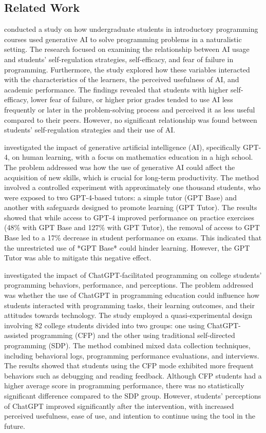 \documentclass[a4paper,twoside]{article}
\begin{document}
\subsection{Related Work}

\cite{Margulieux24} conducted a study on how undergraduate students in
introductory programming courses used generative AI to solve programming
problems in a naturalistic setting. The research focused on examining the
relationship between AI usage and students’ self-regulation strategies,
self-efficacy, and fear of failure in programming. Furthermore, the study
explored how these variables interacted with the characteristics of the learners,
the perceived usefulness of AI, and academic performance. The findings revealed
that students with higher self-efficacy, lower fear of failure, or higher prior
grades tended to use AI less frequently or later in the problem-solving process
and perceived it as less useful compared to their peers. However, no significant
relationship was found between students’ self-regulation strategies and their
use of AI.

\cite{Bastani24} investigated the impact of generative artificial intelligence
(AI), specifically GPT-4, on human learning, with a focus on mathematics
education in a high school. The problem addressed was how the use of generative
AI could affect the acquisition of new skills, which is crucial for long-term
productivity. The method involved a controlled experiment with approximately
one thousand students, who were exposed to two GPT-4-based tutors: a simple
tutor (GPT Base) and another with safeguards designed to promote learning
(GPT Tutor). The results showed that while access to GPT-4 improved performance
on practice exercises (48\% with GPT Base and 127\% with GPT Tutor), the removal
of access to GPT Base led to a 17\% decrease in student performance on exams.
This indicated that the unrestricted use of *GPT Base* could hinder learning.
However, the GPT Tutor was able to mitigate this negative effect.

\cite{Boudouaia24} investigated the impact of ChatGPT-facilitated programming on
college students’ programming behaviors, performance, and perceptions. The
problem addressed was whether the use of ChatGPT in programming education could
influence how students interacted with programming tasks, their learning
outcomes, and their attitudes towards technology. The study employed a
quasi-experimental design involving 82 college students divided into two groups:
one using ChatGPT-assisted programming (CFP) and the other using traditional
self-directed programming (SDP). The method combined mixed data collection
techniques, including behavioral logs, programming performance evaluations, and
interviews. The results showed that students using the CFP mode exhibited more
frequent behaviors such as debugging and reading feedback. Although CFP students
had a higher average score in programming performance, there was no
statistically significant difference compared to the SDP group. However,
students’ perceptions of ChatGPT improved significantly after the intervention,
with increased perceived usefulness, ease of use, and intention to continue
using the tool in the future.
\end{document}
